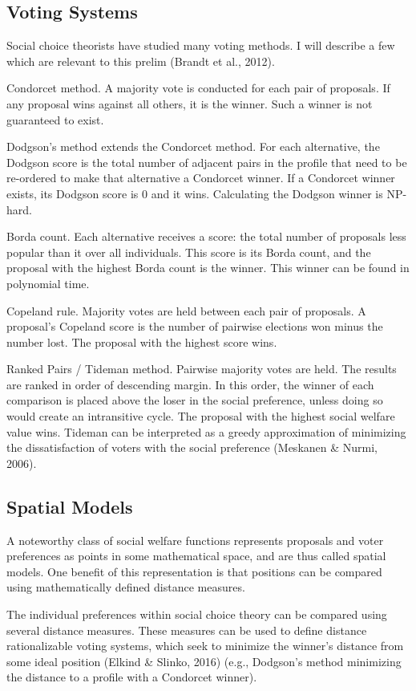 \subsection{Voting Systems}
Social choice theorists have studied many voting methods. I will describe a few which are relevant to this prelim (Brandt et al., 2012).

Condorcet method. A majority vote is conducted for each pair of proposals. If any proposal wins against all others, it is the winner. Such a winner is not guaranteed to exist.

Dodgson’s method extends the Condorcet method. For each alternative, the Dodgson score is the total number of adjacent pairs in the profile that need to be re-ordered to make that alternative a Condorcet winner. If a Condorcet winner exists, its Dodgson score is 0 and it wins. Calculating the Dodgson winner is NP-hard.

Borda count. Each alternative receives a score: the total number of proposals less popular than it over all individuals. This score is its Borda count, and the proposal with the highest Borda count is the winner. This winner can be found in polynomial time.

Copeland rule. Majority votes are held between each pair of proposals. A proposal’s Copeland score is the number of pairwise elections won minus the number lost. The proposal with the highest score wins.

Ranked Pairs / Tideman method. Pairwise majority votes are held. The results are ranked in order of descending margin. In this order, the winner of each comparison is placed above the loser in the social preference, unless doing so would create an intransitive cycle. The proposal with the highest social welfare value wins. Tideman can be interpreted as a greedy approximation of minimizing the dissatisfaction of voters with the social preference (Meskanen \& Nurmi, 2006).

\subsection{Spatial Models}
A noteworthy class of social welfare functions represents proposals and voter preferences as points in some mathematical space, and are thus called spatial models. One benefit of this representation is that positions can be compared using mathematically defined distance measures.

The individual preferences within social choice theory can be compared using several distance measures. These measures can be used to define distance rationalizable voting systems, which seek to minimize the winner’s distance from some ideal position (Elkind \& Slinko, 2016) (e.g., Dodgson’s method minimizing the distance to a profile with a Condorcet winner).

